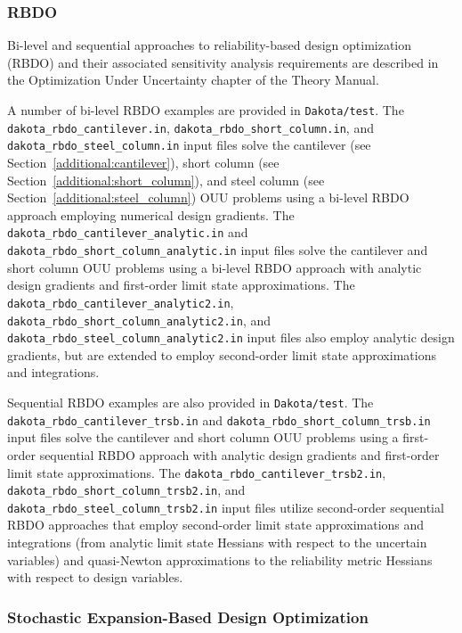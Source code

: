 \subsubsection{RBDO} \label{models:ex:ouu:rbdo}

Bi-level and sequential approaches to reliability-based design
optimization (RBDO) and their associated sensitivity analysis
requirements are described in the Optimization Under Uncertainty
chapter of the Theory Manual.

A number of bi-level RBDO examples are provided in \texttt{Dakota/test}.
The \texttt{dakota\_rbdo\_cantilever.in},
\texttt{dakota\_rbdo\_short\_column.in}, and
\texttt{dakota\_rbdo\_steel\_column.in} input files solve the
cantilever (see Section~\ref{additional:cantilever}), short column
(see Section~\ref{additional:short_column}), and steel column (see
Section~\ref{additional:steel_column}) OUU problems using a bi-level
RBDO approach employing numerical design gradients.  The 
\texttt{dakota\_rbdo\_cantilever\_analytic.in} and
\texttt{dakota\_rbdo\_short\_column\_analytic.in} input files solve
the cantilever and short column OUU problems using a bi-level RBDO
approach with analytic design gradients and first-order limit state
approximations.  The \texttt{dakota\_rbdo\_cantilever\_analytic2.in},
\texttt{dakota\_rbdo\_short\_column\_analytic2.in}, and
\texttt{dakota\_rbdo\_steel\_column\_analytic2.in} input files also
employ analytic design gradients, but are extended to employ
second-order limit state approximations and integrations.

Sequential RBDO examples are also provided in \texttt{Dakota/test}.  
The \texttt{dakota\_rbdo\_cantilever\_trsb.in} and
\texttt{dakota\_rbdo\_short\_column\_trsb.in} input files solve 
the cantilever and short column OUU problems using a first-order
sequential RBDO approach with analytic design gradients and
first-order limit state approximations.  The
\texttt{dakota\_rbdo\_cantilever\_trsb2.in},
\texttt{dakota\_rbdo\_short\_column\_trsb2.in}, and 
\texttt{dakota\_rbdo\_steel\_column\_trsb2.in} input files 
utilize second-order sequential RBDO approaches that employ
second-order limit state approximations and integrations (from
analytic limit state Hessians with respect to the uncertain variables)
and quasi-Newton approximations to the reliability metric Hessians
with respect to design variables.

\subsubsection{Stochastic Expansion-Based Design Optimization} \label{models:ex:ouu:sebdo}

